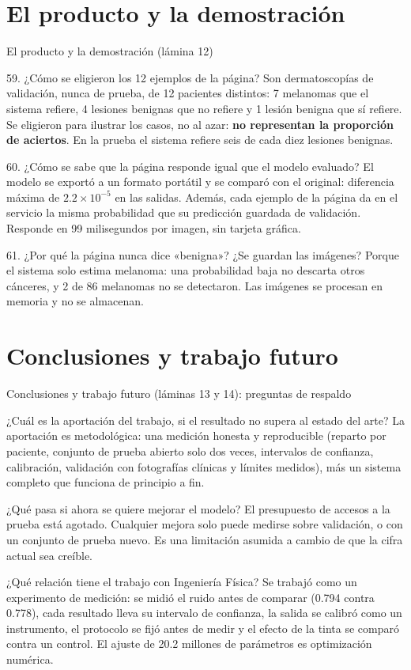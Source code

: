 \documentclass[aspectratio=169,10pt]{beamer}
\newcommand{\qa}[2]{\begin{block}{#1}\footnotesize #2\end{block}}
\begin{document}
\section{El producto y la demostración}
\begin{frame}{El producto y la demostración (lámina 12)}
  \qa{59. ¿Cómo se eligieron los 12 ejemplos de la página?}{
    Son dermatoscopías de validación, nunca de prueba, de 12 pacientes distintos: 7 melanomas que el sistema refiere, 4 lesiones benignas que no refiere y 1 lesión benigna que sí refiere. Se eligieron para ilustrar los casos, no al azar: \textbf{no representan la proporción de aciertos}. En la prueba el sistema refiere seis de cada diez lesiones benignas.}
  \qa{60. ¿Cómo se sabe que la página responde igual que el modelo evaluado?}{
    El modelo se exportó a un formato portátil y se comparó con el original: diferencia máxima de $2.2 \times 10^{-5}$ en las salidas. Además, cada ejemplo de la página da en el servicio la misma probabilidad que su predicción guardada de validación. Responde en 99 milisegundos por imagen, sin tarjeta gráfica.}
  \qa{61. ¿Por qué la página nunca dice «benigna»? ¿Se guardan las imágenes?}{
    Porque el sistema solo estima melanoma: una probabilidad baja no descarta otros cánceres, y 2 de 86 melanomas no se detectaron. Las imágenes se procesan en memoria y no se almacenan.}
\end{frame}

\section{Conclusiones y trabajo futuro}
\begin{frame}{Conclusiones y trabajo futuro (láminas 13 y 14): preguntas de respaldo}
  \qa{¿Cuál es la aportación del trabajo, si el resultado no supera al estado del arte?}{
    La aportación es metodológica: una medición honesta y reproducible (reparto por paciente, conjunto de prueba abierto solo dos veces, intervalos de confianza, calibración, validación con fotografías clínicas y límites medidos), más un sistema completo que funciona de principio a fin.}
  \qa{¿Qué pasa si ahora se quiere mejorar el modelo?}{
    El presupuesto de accesos a la prueba está agotado. Cualquier mejora solo puede medirse sobre validación, o con un conjunto de prueba nuevo. Es una limitación asumida a cambio de que la cifra actual sea creíble.}
  \qa{¿Qué relación tiene el trabajo con Ingeniería Física?}{
    Se trabajó como un experimento de medición: se midió el ruido antes de comparar (0.794 contra 0.778), cada resultado lleva su intervalo de confianza, la salida se calibró como un instrumento, el protocolo se fijó antes de medir y el efecto de la tinta se comparó contra un control. El ajuste de 20.2 millones de parámetros es optimización numérica.}
\end{frame}
\end{document}
